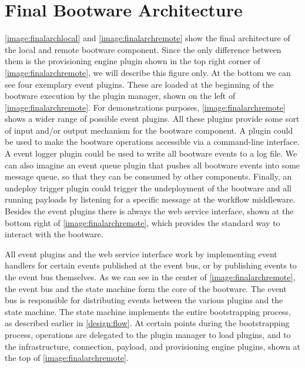 \section{Final Bootware Architecture}
\label{design:finalarch}

\autoref{image:finalarchlocal} and \autoref{image:finalarchremote} show the final architecture of the local and remote bootware component.
Since the only difference between them is the provisioning engine plugin shown in the top right corner of \autoref{image:finalarchremote}, we will describe this figure only.
At the bottom we can see four exemplary event plugins.
These are loaded at the beginning of the bootware execution by the plugin manager, shown on the left of \autoref{image:finalarchremote}.
For demonstrations purposes, \autoref{image:finalarchremote} shows a wider range of possible event plugins.
All these plugins provide some sort of input and/or output mechanism for the bootware component.
A  plugin could be used to make the bootware operations accessible via a command-line interface.
A event logger plugin could be used to write all bootware events to a log file.
We can also imagine an event queue plugin that pushes all bootware events into some message queue, so that they can be consumed by other components.
Finally, an undeploy trigger plugin could trigger the undeployment of the bootware and all running payloads by listening for a specific message at the workflow middleware.
Besides the event plugins there is always the web service interface, shown at the bottom right of \autoref{image:finalarchremote}, which provides the standard way to interact with the bootware.

All event plugins and the web service interface work by implementing event handlers for certain events published at the event bus, or by publishing events to the event bus themselves.
As we can see in the center of \autoref{image:finalarchremote}, the event bus and the state machine form the core of the bootware.
The event bus is responsible for distributing events between the various plugins and the state machine.
The state machine implements the entire bootstrapping process, as described earlier in \autoref{design:flow}.
At certain points during the bootstrapping process, operations are delegated to the plugin manager to load plugins, and to the infrastructure, connection, payload, and provisioning engine plugins, shown at the top of \autoref{image:finalarchremote}.

